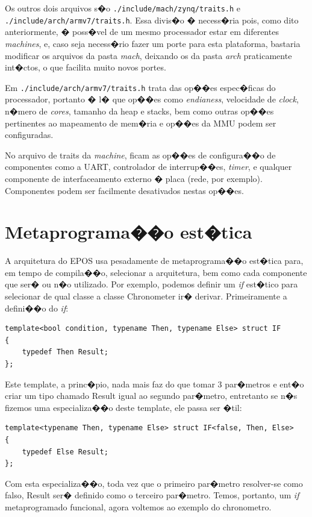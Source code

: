 \documentclass{ufscThesis/ufscThesis} %
\begin{document}
Os outros dois arquivos s�o \verb+./include/mach/zynq/traits.h+ e \verb+./include/arch/armv7/traits.h+. Essa divis�o � necess�ria pois, como dito anteriormente, � poss�vel de um mesmo processador estar em diferentes \emph{machines}, e, caso seja necess�rio fazer um porte para esta plataforma, bastaria modificar os arquivos da pasta \emph{mach}, deixando os da pasta \emph{arch} praticamente int�ctos, o que facilita muito novos portes.

Em \verb+./include/arch/armv7/traits.h+ trata das op��es espec�ficas do processador, portanto � l� que op��es como \emph{endianess}, velocidade de \emph{clock}, n�mero de \emph{cores}, tamanho da heap e stacks, bem como outras op��es pertinentes ao mapeamento de mem�ria e op��es da MMU podem ser configuradas.

No arquivo de traits da \emph{machine}, ficam as op��es de configura��o de componentes como a UART, controlador de interrup��es, \emph{timer}, e qualquer componente de interfaceamento externo � placa (rede, por exemplo). Componentes podem ser facilmente desativados nestas op��es.

\section{Metaprograma��o est�tica}

A arquitetura do EPOS usa pesadamente de metaprograma��o est�tica para, em tempo de compila��o, selecionar a arquitetura, bem como cada componente que ser� ou n�o utilizado. Por exemplo, podemos definir um \emph{if} est�tico para selecionar de qual classe a classe Chronometer ir� derivar. Primeiramente a defini��o do \emph{if}:

\begin{verbatim}
template<bool condition, typename Then, typename Else> struct IF
{
    typedef Then Result;
};
\end{verbatim}

Este template, a princ�pio, nada mais faz do que tomar 3 par�metros e ent�o criar um tipo chamado Result igual ao segundo par�metro, entretanto se n�s fizemos uma especializa��o deste template, ele passa ser �til:

\begin{verbatim}
template<typename Then, typename Else> struct IF<false, Then, Else>
{
    typedef Else Result;
};
\end{verbatim}

Com esta especializa��o, toda vez que o primeiro par�metro resolver-se como falso, Result ser� definido como o terceiro par�metro. Temos, portanto, um \emph{if} metaprogramado funcional, agora voltemos ao exemplo do chronometro.
\end{document}
